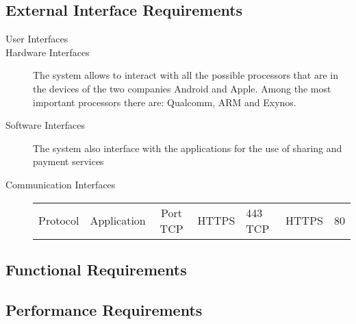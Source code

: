 \subsection{External Interface Requirements}
				\begin{description}
					\item[User Interfaces]
					\item[Hardware Interfaces] The system allows to interact with all the possible processors that are in the devices of the two companies Android and Apple. Among the most important processors there are: Qualcomm, ARM and Exynos.

					\item[Software Interfaces]			
						The system also interface with the applications for the use of sharing and payment services
						
					\item[Communication Interfaces]
					
					\begin{tabular}{|c|c|c|}
					\hline
					Protocol	& Application	& Port
					\hline
					TCP		& HTTPS		& 443
					\hline
					TCP		& HTTPS		& 80
					\end{tabular}
				\end{description}

\subsection{Functional Requirements}
	
			
\subsection{Performance Requirements}
		
